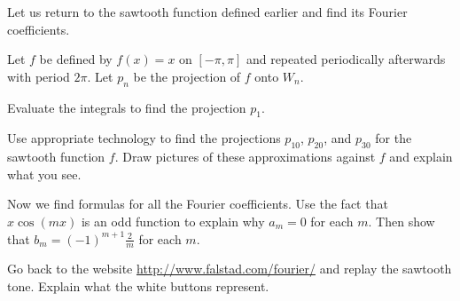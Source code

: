 Let us return to the sawtooth function defined earlier and find its Fourier coefficients.

\begin{pactivity} \label{act:Fourier_sawtooth} Let $f$ be defined by $f(x) = x$ on $[-\pi,\pi]$ and repeated periodically afterwards with period $2\pi$. Let $p_n$ be the projection of $f$ onto $W_n$.
	\ba
	\item Evaluate the integrals to find the projection $p_1$.

	\item  Use appropriate technology to find the projections $p_{10}$, $p_{20}$, and $p_{30}$ for the sawtooth function $f$. Draw pictures of these approximations against $f$ and explain what you see.  	
	
	\item Now we find formulas for all the Fourier coefficients. Use the fact that $x \cos(mx)$ is an odd function to explain why $a_m = 0$ for each $m$. Then show that $b_m = (-1)^{m+1}\frac{2}{m}$ for each $m$.

		
	\item Go back to the website \url{http://www.falstad.com/fourier/} and replay the sawtooth tone. Explain what the white buttons represent. 

	
	\ea
	
\end{pactivity}



